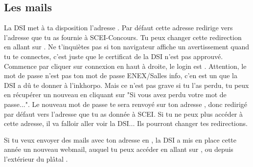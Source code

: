 




\subsection{Les mails}

La DSI met à ta disposition l'adresse . Par d\'efaut cette adresse redirige vers l'adresse que tu as fournie à SCEI-Concours. Tu peux changer cette redirection en allant sur . Ne t'inquiètes pas si ton navigateur affiche un avertissement quand tu te connectes, c'est juste que le certificat de la DSI n'est pas approuv\'e. Commence par cliquer sur connexion en haut à droite, le login est . Attention, le mot de passe n'est pas ton mot de passe ENEX/Salles info, c'en est un que la DSI a d\^u te donner à l'inkhorpo. Mais ce n'est pas grave si tu l'as perdu, tu peux en r\'ecup\'erer un nouveau en cliquant sur "Si vous avez perdu votre mot de passe...". Le nouveau mot de passe te sera renvoyé sur ton adresse , donc redirig\'e par d\'efaut vers l'adresse que tu as donn\'ee à SCEI. Si tu ne peux plus acc\'eder à cette adresse, il va falloir aller voir la DSI... Ils pourront changer tes redirections.

Si tu veux envoyer des mails avec ton adresse en , la DSI a mis en place cette ann\'ee un nouveau webmail, auquel tu peux acc\'eder en allant sur , ou depuis l'extérieur du pl\^atal . 


